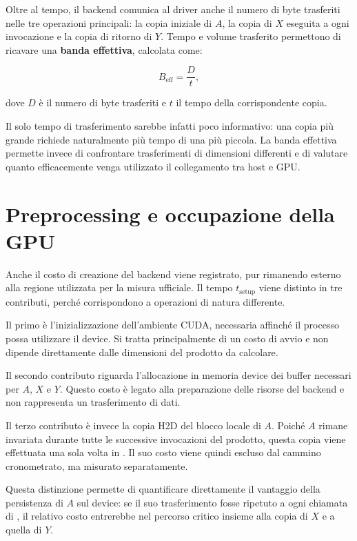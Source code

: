 Oltre al tempo, il backend comunica al driver anche il numero di byte
trasferiti nelle tre operazioni principali: la copia iniziale di $A$, la
copia di $X$ eseguita a ogni invocazione e la copia di ritorno di $Y$.
Tempo e volume trasferito permettono di ricavare una \textbf{banda effettiva}, calcolata come:

\begin{equation}
B_{\mathrm{eff}} = \frac{D}{t},
\end{equation}

dove $D$ è il numero di byte trasferiti e $t$ il tempo della corrispondente
copia.

Il solo tempo di trasferimento sarebbe infatti poco informativo: una copia
più grande richiede naturalmente più tempo di una più piccola. La banda
effettiva permette invece di confrontare trasferimenti di dimensioni
differenti e di valutare quanto efficacemente venga utilizzato il collegamento
tra host e GPU.

\section{Preprocessing e occupazione della GPU}
\label{sec:preprocessing-cuda}

Anche il costo di creazione del backend viene registrato, pur rimanendo
esterno alla regione utilizzata per la misura ufficiale. Il tempo
$t_{\mathrm{setup}}$ viene distinto in tre contributi, perché corrispondono
a operazioni di natura differente.

Il primo è l'inizializzazione dell'ambiente CUDA, necessaria affinché il
processo possa utilizzare il device. Si tratta principalmente di un costo
di avvio e non dipende direttamente dalle dimensioni del prodotto da
calcolare.

Il secondo contributo riguarda l'allocazione in memoria device dei buffer
necessari per $A$, $X$ e $Y$. Questo costo è legato alla preparazione delle
risorse del backend e non rappresenta un trasferimento di dati.

Il terzo contributo è invece la copia H2D del blocco locale di $A$.
Poiché $A$ rimane invariata durante tutte le successive invocazioni del
prodotto, questa copia viene effettuata una sola volta in
. Il suo costo viene quindi escluso dal cammino
cronometrato, ma misurato separatamente.

Questa distinzione permette di quantificare direttamente il vantaggio della
persistenza di $A$ sul device: se il suo trasferimento fosse ripetuto a ogni
chiamata di , il relativo costo entrerebbe nel percorso
critico insieme alla copia di $X$ e a quella di $Y$.

